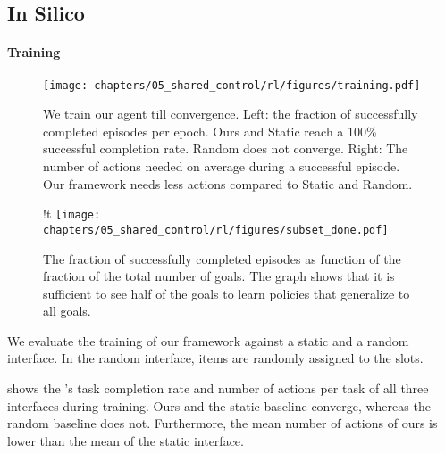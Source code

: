 \subsection{In Silico}
\paragraph{Training}

\begin{figure}[!t]
    \centering
        \centering
        \texttt{[image: chapters/05\_shared\_control/rl/figures/training.pdf]} %
        \caption{We train our agent till convergence. Left: the fraction of successfully completed episodes per epoch. Ours and Static reach a 100\% successful completion rate. Random does not converge. Right: The number of actions needed on average during a successful episode. Our framework needs less actions compared to Static and Random.}
        \label{fig:training}
\end{figure}

\begin{figure}[t]{!t}
        \centering
        \texttt{[image: chapters/05\_shared\_control/rl/figures/subset\_done.pdf]}
        \caption{The fraction of successfully completed episodes as function of the fraction of the total number of goals. The graph shows that it is sufficient to see half of the goals to learn policies that generalize to all goals.}
        \label{fig:goal}
\end{figure}


We evaluate the training of our framework against a static and a random interface. In the random interface, items are randomly assigned to the slots. 

 shows the \useragent's task completion rate and number of actions per task of all three interfaces during training. Ours and the static baseline converge, whereas the random baseline does not. Furthermore, the mean number of actions of ours is lower than the mean of the static interface.

